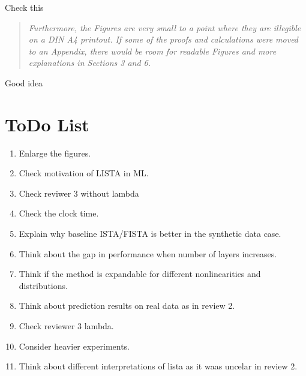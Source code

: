 \documentclass{article}
\begin{document}
Check this

\begin{quote}
\textit{Furthermore, the Figures are very small to a point where they are illegible on a DIN A4 printout.
If some of the proofs and calculations were moved to an Appendix, there would be room for readable Figures and more explanations in Sections 3 and 6.}
\end{quote}
Good idea

\section*{ToDo List}
\begin{enumerate}
  \item Enlarge the figures.
  \item Check motivation of LISTA in ML.
  \item Check reviwer 3 without lambda
  \item Check the clock time.
  \item Explain why baseline ISTA/FISTA is better in the synthetic data case.
  \item Think about the gap in performance when number of layers increases.
  \item Think if the method is expandable for different nonlinearities and distributions.
  \item Think about prediction results on real data as in review 2.
  \item Check reviewer 3 lambda.
  \item Consider heavier experiments.
  \item Think about different interpretations of lista as it waas uncelar in review 2.
\end{enumerate}
\end{document}
